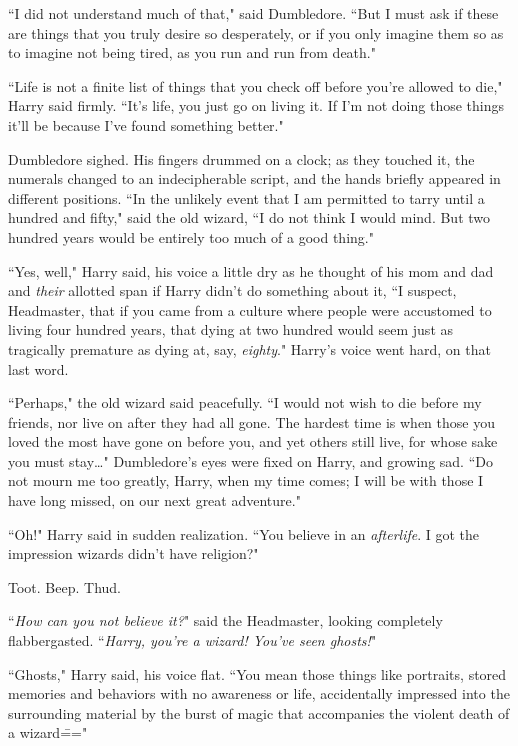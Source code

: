 ``I did not understand much of that," said Dumbledore. ``But I must ask if these are things that you truly desire so desperately, or if you only imagine them so as to imagine not being tired, as you run and run from death."

``Life is not a finite list of things that you check off before you're allowed to die," Harry said firmly. ``It's life, you just go on living it. If I'm not doing those things it'll be because I've found something better."

Dumbledore sighed. His fingers drummed on a clock; as they touched it, the numerals changed to an indecipherable script, and the hands briefly appeared in different positions. ``In the unlikely event that I am permitted to tarry until a hundred and fifty," said the old wizard, ``I do not think I would mind. But two hundred years would be entirely too much of a good thing."

``Yes, well," Harry said, his voice a little dry as he thought of his mom and dad and \emph{their} allotted span if Harry didn't do something about it, ``I suspect, Headmaster, that if you came from a culture where people were accustomed to living four hundred years, that dying at two hundred would seem just as tragically premature as dying at, say, \emph{eighty}." Harry's voice went hard, on that last word.

``Perhaps," the old wizard said peacefully. ``I would not wish to die before my friends, nor live on after they had all gone. The hardest time is when those you loved the most have gone on before you, and yet others still live, for whose sake you must stay{\ldots}" Dumbledore's eyes were fixed on Harry, and growing sad. ``Do not mourn me too greatly, Harry, when my time comes; I will be with those I have long missed, on our next great adventure."

``Oh!" Harry said in sudden realization. ``You believe in an \emph{afterlife}. I got the impression wizards didn't have religion?"

\later

Toot. Beep. Thud.

``\emph{How can you not believe it?}" said the Headmaster, looking completely flabbergasted. ``\emph{Harry, you're a wizard! You've seen ghosts!}"

``Ghosts," Harry said, his voice flat. ``You mean those things like portraits, stored memories and behaviors with no awareness or life, accidentally impressed into the surrounding material by the burst of magic that accompanies the violent death of a wizard\==="


